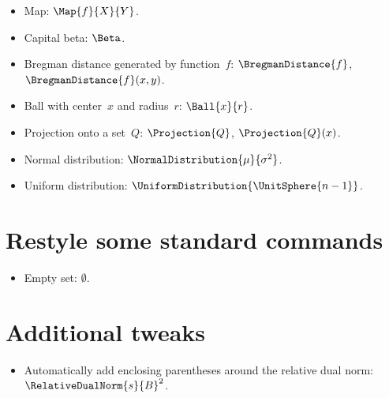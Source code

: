 \documentclass{article}
\begin{document}
  \begin{itemize}
    \item Map: $\Map{f}{X}{Y}$.
    \item Capital beta: $\Beta$.
    \item Bregman distance generated by function~$f$: $\BregmanDistance{f}$, $\BregmanDistance{f}(x, y)$.
    \item Ball with center~$x$ and radius~$r$: $\Ball{x}{r}$.
    \item Projection onto a set~$Q$: $\Projection{Q}$, $\Projection{Q}(x)$.
    \item Normal distribution: $\NormalDistribution{\mu}{\sigma^2}$.
    \item Uniform distribution: $\UniformDistribution{\UnitSphere{n - 1}}$.
  \end{itemize}

  \section{Restyle some standard commands}

  \begin{itemize}
    \item Empty set: $\emptyset$.
  \end{itemize}

  \section{Additional tweaks}

  \begin{itemize}
    \item Automatically add enclosing parentheses around the relative dual norm: $\RelativeDualNorm{s}{B}^2$.
  \end{itemize}
\end{document}
